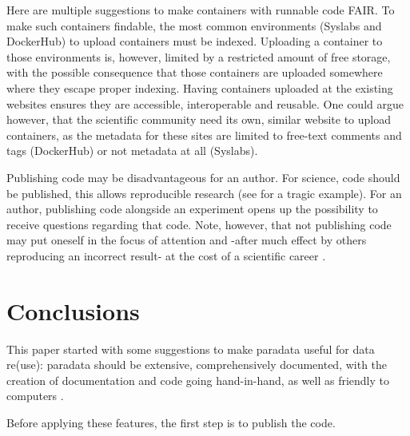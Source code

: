 
Here are multiple suggestions to make containers with runnable code FAIR.
To make such containers findable, the most common 
environments (Syslabs and DockerHub) to upload containers must be indexed.
Uploading a container to those environments is, however, limited by
a restricted amount of free storage, with the possible consequence that
those containers are uploaded somewhere where they escape proper indexing.
Having containers uploaded at the existing websites ensures they are
accessible, interoperable and reusable.
One could argue however, that the scientific community need its own,
similar website to upload containers, as the metadata for these
sites are limited to free-text comments and tags (DockerHub)
or not metadata at all (Syslabs).


Publishing code may be disadvantageous for an author.
For science, code should be published, 
this allows reproducible research 
(see \cite{haibe2020importance} for a tragic example).
For an author, publishing code alongside an experiment opens up
the possibility to receive questions regarding that code.
Note, however, that not publishing code may put 
oneself in the focus of attention
and -after much effect by others reproducing an incorrect result-
at the cost of a scientific career \cite{baggerly2009deriving}.

\section{Conclusions}

This paper started with some suggestions to 
make paradata useful for data re(use):
paradata should be extensive, comprehensively documented,
with the creation of documentation and code going hand-in-hand,
as well as friendly to computers \cite{huvila2022improving}.

Before applying these features, the first step is to publish 
the code. 

